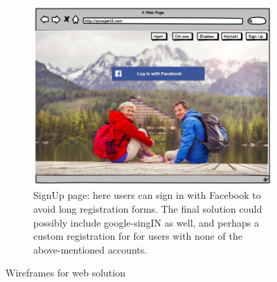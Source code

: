 \begin{figure}[H]
\begin{subfigure}{.5\textwidth}
  \includegraphics[width=.8\linewidth]{wireframes/web/SignUp}
  \caption{SignUp page: here users can sign in with Facebook to avoid long registration forms. The final solution could possibly include google-singIN as well, and perhaps a custom registration for  for users with none of the above-mentioned accounts.}
  \label{fig:videoSignUp}
\end{subfigure}
\caption{Wireframes for web solution}
\end{figure}

    

